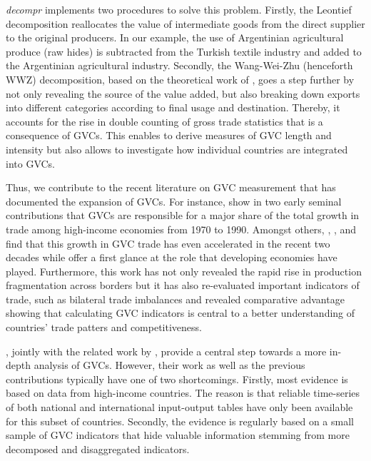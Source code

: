 \documentclass[a4paper,11pt]{article}
\begin{document}
\textit{decompr} implements two procedures to solve this problem. Firstly, the Leontief decomposition \citep{wale36} reallocates the value of intermediate goods from the direct supplier to the original producers. In our example, the use of Argentinian agricultural produce (raw hides) is subtracted from the Turkish textile industry and added to the Argentinian agricultural industry. Secondly, the Wang-Wei-Zhu (henceforth WWZ) decomposition, based on the theoretical work of \citet{zhwaetal13}, goes a step further by not only revealing the source of the value added, but also breaking down exports into different categories according to final usage and destination. Thereby, it accounts for the rise in double counting of gross trade statistics that is a consequence of GVCs. This enables \citet{zhwaetal13} to derive measures of GVC length and intensity but also allows to investigate how individual countries are integrated into GVCs.

Thus, we contribute to the recent literature on GVC measurement that has documented the expansion of GVCs. For instance, \citet{dahuetal98, dahuetal01} show in two early seminal contributions that GVCs are responsible for a major share of the total growth in trade among high-income economies from 1970 to 1990. Amongst others, \citet{gudaetal11}, \citet{rojoguno12a}, and \citet{ribajalo15} find that this growth in GVC trade has even accelerated in the recent two decades while \citet{prkoetal15} offer a first glance at the role that developing economies have played. Furthermore, this work has not only revealed the rapid rise in production fragmentation across borders but it has also re-evaluated important indicators of trade, such as bilateral trade imbalances and revealed comparative advantage showing that calculating GVC indicators is central to a better understanding of countries' trade patters and competitiveness.

\citet{zhwaetal13}, jointly with the related work by \citet{rokoetal14}, provide a central step towards a more in-depth analysis of GVCs. However, their work as well as the previous contributions typically have one of two shortcomings. Firstly, most evidence is based on data from high-income countries. The reason is that reliable time-series of both national and international input-output tables have only been available for this subset of countries. Secondly, the evidence is regularly based on a small sample of GVC indicators that hide valuable information stemming from more decomposed and disaggregated indicators. 
\end{document}
